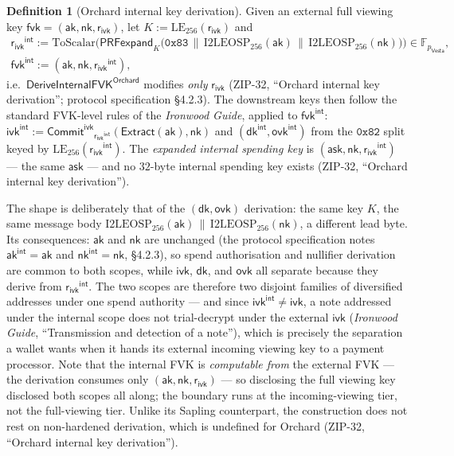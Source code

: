 \documentclass[11pt,a4paper]{article}
\theoremstyle{definition}
\newtheorem{definition}[theorem]{Definition}
\newcommand{\F}{\mathbb{F}}
\newcommand{\Vesta}{\ensuremath{\mathsf{Vesta}}}
\newcommand{\CommitIvk}{\ensuremath{\mathsf{Commit}^{\mathsf{ivk}}}}
\newcommand{\Extract}{\ensuremath{\mathsf{Extract}}}
\newcommand{\ask}{\ensuremath{\mathsf{ask}}}
\newcommand{\aksym}{\ensuremath{\mathsf{ak}}}
\newcommand{\nksym}{\ensuremath{\mathsf{nk}}}
\newcommand{\ivk}{\ensuremath{\mathsf{ivk}}}
\newcommand{\fvk}{\ensuremath{\mathsf{fvk}}}
\newcommand{\ovk}{\ensuremath{\mathsf{ovk}}}
\newcommand{\dk}{\ensuremath{\mathsf{dk}}}
\newcommand{\rivk}{\ensuremath{\mathsf{r_{ivk}}}}
\begin{document}
\begin{definition}[Orchard internal key derivation]\label{def:zip32-internal}
Given an external full viewing key $\fvk = (\aksym, \nksym, \rivk)$, let
$K := \mathrm{LE}_{256}(\rivk)$ and
\begin{gather*}
\rivk^{\mathsf{int}} := \mathrm{ToScalar}\bigl(\mathsf{PRFexpand}_{K}\bigl(
\mathtt{0x83} \,\|\, \mathrm{I2LEOSP}_{256}(\aksym) \,\|\,
\mathrm{I2LEOSP}_{256}(\nksym)\bigr)\bigr) \in \F_{p_{\Vesta}}, \\
\fvk^{\mathsf{int}} := (\aksym, \nksym, \rivk^{\mathsf{int}}),
\end{gather*}
i.e.\ $\mathsf{DeriveInternalFVK}^{\mathsf{Orchard}}$ modifies \emph{only}
$\rivk$ (ZIP-32, ``Orchard internal key derivation''; protocol
specification \S4.2.3). The downstream keys then follow the standard
FVK-level rules of the \emph{Ironwood Guide}, applied to
$\fvk^{\mathsf{int}}$:
$\ivk^{\mathsf{int}} := \CommitIvk_{\rivk^{\mathsf{int}}}(\Extract(\aksym), \nksym)$
and $(\dk^{\mathsf{int}}, \ovk^{\mathsf{int}})$ from the $\mathtt{0x82}$
split keyed by $\mathrm{LE}_{256}(\rivk^{\mathsf{int}})$. The
\emph{expanded internal spending key} is
$(\ask, \nksym, \rivk^{\mathsf{int}})$ --- the same $\ask$ --- and no
$32$-byte internal spending key exists (ZIP-32, ``Orchard internal key
derivation'').
\end{definition}

The shape is deliberately that of the $(\dk, \ovk)$ derivation: the same
key $K$, the same message body
$\mathrm{I2LEOSP}_{256}(\aksym) \,\|\, \mathrm{I2LEOSP}_{256}(\nksym)$,
a different lead byte. Its consequences: $\aksym$ and $\nksym$ are
unchanged (the protocol specification notes
$\aksym^{\mathsf{int}} = \aksym$ and $\nksym^{\mathsf{int}} = \nksym$,
\S4.2.3), so spend authorisation and nullifier derivation are common to
both scopes, while $\ivk$, $\dk$, and $\ovk$ all separate because they
derive from $\rivk^{\mathsf{int}}$. The two scopes are therefore two
disjoint families of diversified addresses under one spend authority ---
and since $\ivk^{\mathsf{int}} \ne \ivk$, a note addressed under the
internal scope does not trial-decrypt under the external $\ivk$
(\emph{Ironwood Guide}, ``Transmission and detection of a note''), which is
precisely the separation a wallet wants when it hands its external incoming
viewing key to a payment processor. Note that the internal FVK is
\emph{computable from} the external FVK --- the derivation consumes only
$(\aksym, \nksym, \rivk)$ --- so disclosing the full viewing key disclosed
both scopes all along; the boundary runs at the incoming-viewing tier, not
the full-viewing tier. Unlike its Sapling counterpart, the construction
does not rest on non-hardened derivation, which is undefined for Orchard
(ZIP-32, ``Orchard internal key derivation'').
\end{document}
